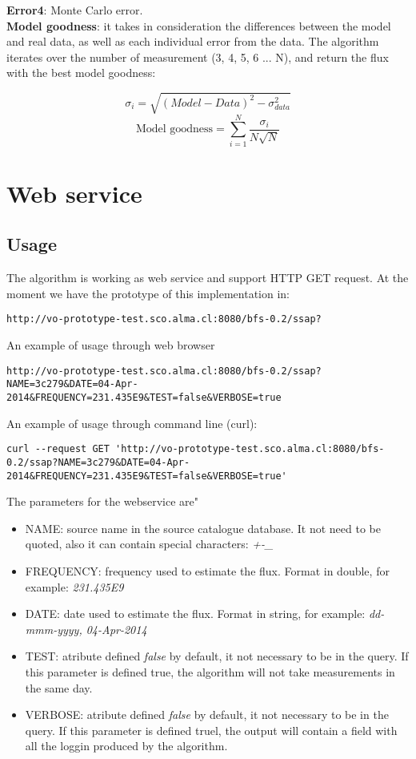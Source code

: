 \documentclass[10pt]{article}
\begin{document}
\noindent \textbf{Error4}: Monte Carlo error. \\

\noindent \textbf{Model goodness}: it takes in consideration the differences
between the model and real data, as well as each individual error from the
data. The algorithm iterates over the number of measurement (3, 4, 5, 6 ... N),
and return the flux with the best model goodness:

$$ \sigma_i = \sqrt{ (Model - Data)^2 - \sigma_{data}^2 } $$
$$ \text{Model goodness} = \sum_{i=1}^{N}\frac{\sigma_i}{N\sqrt{N}} $$

\section{Web service}
\subsection{Usage}
The algorithm is working as web service and support HTTP GET request. At the moment we have the
prototype of this implementation in:

\begingroup
\fontsize{8pt}{10pt}\selectfont
\begin{verbatim}
http://vo-prototype-test.sco.alma.cl:8080/bfs-0.2/ssap?
\end{verbatim}
\endgroup

\noindent An example of usage through web browser
\begingroup
\fontsize{6pt}{10pt}\selectfont
\begin{verbatim}
http://vo-prototype-test.sco.alma.cl:8080/bfs-0.2/ssap?NAME=3c279&DATE=04-Apr-2014&FREQUENCY=231.435E9&TEST=false&VERBOSE=true
\end{verbatim}
\endgroup

\noindent An example of usage through command line (curl):
\begingroup
\fontsize{6pt}{10pt}\selectfont
\begin{verbatim}
curl --request GET 'http://vo-prototype-test.sco.alma.cl:8080/bfs-0.2/ssap?NAME=3c279&DATE=04-Apr-2014&FREQUENCY=231.435E9&TEST=false&VERBOSE=true'
\end{verbatim}
\endgroup

\noindent The parameters for the webservice are"
\begin{itemize}
 \item NAME: source name in the source catalogue database. It not need to be quoted, also it can contain special characters: \emph{+-\_}
 \item FREQUENCY: frequency used to estimate the flux. Format in double, for example: \emph{231.435E9}
 \item DATE: date used to estimate the flux. Format in string, for example: \emph{dd-mmm-yyyy, 04-Apr-2014}
 \item TEST: atribute defined \emph{false} by default, it not necessary to be in the query. If this parameter is defined true, the algorithm will not take measurements in the same day.
 \item VERBOSE: atribute defined \emph{false} by default, it not necessary to be in the query. If this parameter is defined truel, the output will contain a field with all the loggin produced by the algorithm.
\end{itemize}
\end{document}
